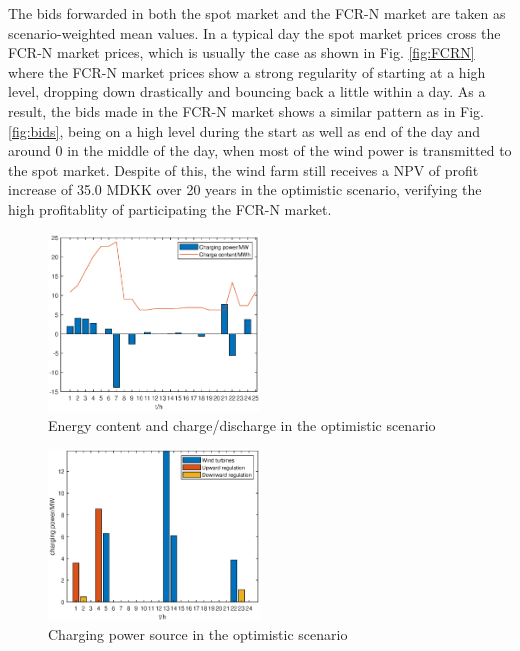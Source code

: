 \documentclass[final,5p,times,twocolumn,authoryear]{elsarticle}
\begin{document}
The bids forwarded in both the spot market and the FCR-N market are taken as scenario-weighted mean values. In a typical day the spot market prices cross the FCR-N market prices, which is usually the case as shown in Fig. \ref{fig:FCRN} where the FCR-N market prices show a strong regularity of starting at a high level, dropping down drastically and bouncing back a little within a day. As a result, the bids made in the FCR-N market shows a similar pattern as in Fig. \ref{fig:bids}, being on a high level during the start as well as end of the day and around 0 in the middle of the day, when most of the wind power is transmitted to the spot market. Despite of this, the wind farm still receives a NPV of profit increase of 35.0 MDKK over 20 years in the optimistic scenario, verifying the high profitablity of participating the FCR-N market.
\begin{figure}[h]
    \centering
    \includegraphics[width = 0.5\textwidth,height =0.25\textwidth]{figures/soc.eps}
    \caption{Energy content and charge/discharge in the optimistic scenario}
    \label{fig:socFig}
\end{figure}

\begin{figure}[h]
    \centering
    \includegraphics[width = 0.5\textwidth,height =0.25\textwidth]{figures/charge.eps}
    \caption{Charging power source in the optimistic scenario}
    \label{fig:charge}
\end{figure}
\end{document}
